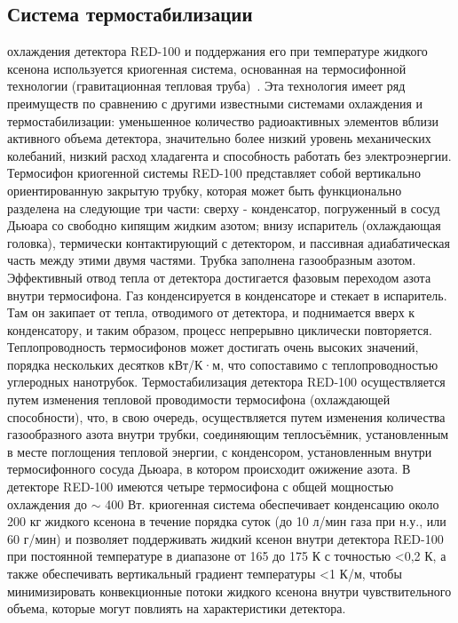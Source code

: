 \subsection{Система термостабилизации}
 охлаждения детектора RED-100 и поддержания его при температуре жидкого ксенона используется криогенная система, основанная на термосифонной технологии (гравитационная тепловая труба)~\cite{red100cryo}. Эта технология имеет ряд преимуществ по сравнению с другими известными системами охлаждения и термостабилизации: уменьшенное количество радиоактивных элементов вблизи активного объема детектора, значительно более низкий уровень механических колебаний, низкий расход хладагента и способность работать без электроэнергии. Термосифон криогенной системы RED-100 представляет собой вертикально ориентированную закрытую трубку, которая может быть функционально разделена на следующие три части: сверху - конденсатор, погруженный в сосуд Дьюара со свободно кипящим жидким азотом; внизу испаритель (охлаждающая головка), термически контактирующий с детектором, и пассивная адиабатическая часть между этими двумя частями. Трубка заполнена газообразным азотом. Эффективный отвод тепла от детектора достигается фазовым переходом азота внутри термосифона. Газ конденсируется в конденсаторе и стекает в испаритель. Там он закипает от тепла, отводимого от детектора, и поднимается вверх к конденсатору, и таким образом, процесс непрерывно циклически повторяется. Теплопроводность термосифонов может достигать очень высоких значений, порядка нескольких десятков кВт/К·м, что сопоставимо с теплопроводностью углеродных нанотрубок. Термостабилизация детектора RED-100 осуществляется путем изменения тепловой проводимости термосифона (охлаждающей способности), что, в свою очередь, осуществляется путем изменения количества газообразного азота внутри трубки, соединяющим теплосъёмник, установленным в месте поглощения тепловой энергии, с конденсором, установленным внутри термосифонного сосуда Дьюара, в котором происходит ожижение азота. В детекторе RED-100 имеются четыре термосифона с общей мощностью охлаждения до $\sim$ 400 Вт.
 криогенная система обеспечивает конденсацию около 200 кг жидкого ксенона в течение порядка суток (до 10 л/мин газа при н.у., или 60 г/мин) и позволяет поддерживать жидкий ксенон внутри детектора RED-100 при постоянной температуре в диапазоне от 165 до 175 К с точностью <0,2 К, а также обеспечивать вертикальный градиент температуры <1 К/м, чтобы минимизировать конвекционные потоки жидкого ксенона внутри чувствительного объема, которые могут повлиять на характеристики детектора.

